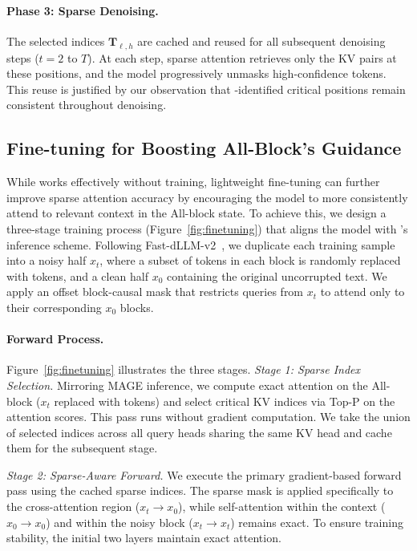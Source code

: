 \paragraph{Phase 3: Sparse Denoising.}
The selected indices $\mathbf{T}_{\ell,h}$ are cached and reused for all subsequent denoising steps ($t = 2$ to $T$). At each step, sparse attention retrieves only the KV pairs at these positions, and the model progressively unmasks high-confidence tokens. This reuse is justified by our observation that \mask-identified critical positions remain consistent throughout denoising.


\subsection{Fine-tuning for Boosting All-\mask Block's Guidance}
\label{subsec:fine_tuning}



While \name works effectively without training, lightweight fine-tuning can further improve sparse attention accuracy by encouraging the model to more consistently attend to relevant context in the All-\mask block state.
To achieve this, we design a three-stage training process (Figure~\ref{fig:finetuning}) that aligns the model with \name's inference scheme.
Following Fast-dLLM-v2~\citep{wu2025fastdllmv2}, we duplicate each training sample into a noisy half $x_t$, where a subset of tokens in each block is randomly replaced with \mask tokens, and a clean half $x_0$ containing the original uncorrupted text.
We apply an offset block-causal mask that restricts queries from $x_t$ to attend only to their corresponding $x_0$ blocks.


\paragraph{Forward Process.}
Figure~\ref{fig:finetuning} illustrates the three stages.
\textit{Stage 1: Sparse Index Selection.}
Mirroring MAGE inference, we compute exact attention on the All-\mask block ($x_t$ replaced with \mask tokens) and select critical KV indices via Top-P on the attention scores.
This pass runs without gradient computation.
We take the union of selected indices across all query heads sharing the same KV head and cache them for the subsequent stage.

\textit{Stage 2: Sparse-Aware Forward.}
We execute the primary gradient-based forward pass using the cached sparse indices.
The sparse mask is applied specifically to the cross-attention region ($x_t \to x_0$), while self-attention within the context ($x_0 \to x_0$) and within the noisy block ($x_t \to x_t$) remains exact.
To ensure training stability, the initial two layers maintain exact attention.

